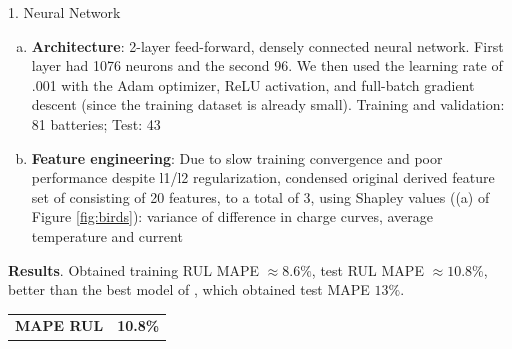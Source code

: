 \documentclass[final]{beamer}
\newlength{\colwidth}
\begin{document}
\begin{frame}[t]
\begin{columns}[t]
\begin{column}{\colwidth}
\begin{block}{1. Neural Network}
\begin{enumerate}[(a)]%
 \item \textbf{Architecture}: 2-layer feed-forward, densely connected neural network.  First layer had 1076 neurons and the second 96. We then used the learning rate of .001 with the Adam optimizer, ReLU activation, and full-batch gradient descent (since the training dataset is already small).  Training and validation: 81 batteries; Test: 43
 \item \textbf{Feature engineering}: Due to slow training convergence and poor performance despite l1/l2 regularization, condensed original derived feature set of \cite{severson2019data} consisting of 20 features, to a total of 3, using Shapley values ((a) of Figure \ref{fig:birds}): variance of difference in charge curves, average temperature and current
\end{enumerate}

    \begin{minipage}[t]{0.65\textwidth}
    \textbf{Results}. Obtained training RUL MAPE $\approx 8.6 \%$, test RUL MAPE $\approx 10.8 \%$, better than the best model of \cite{severson2019data}, which obtained test MAPE $13 \%$.
    \end{minipage}
    \begin{minipage}[t]{0.30\textwidth}
    \begin{flushright}
    \begin{tabular}{ l c }
       \textbf{MAPE RUL} &  \textbf{10.8\%}
    \end{tabular}
    \end{flushright}
    \end{minipage}
    

\end{block}
\end{column}
\end{columns}
\end{frame}
\end{document}
